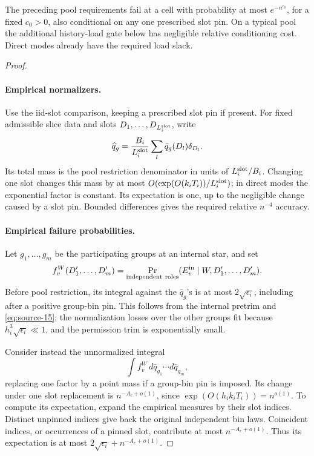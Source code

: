 \begin{lemma}\label{lem:typical-cell-pools}
The preceding pool requirements fail at a cell with probability at most
\(e^{-n^{c_0}}\), for a fixed \(c_0>0\), also conditional on any one
prescribed slot pin. On a typical pool the additional history-load gate
below has negligible relative conditioning cost. Direct modes already
have the required load slack.
\end{lemma}

\begin{proof}\leavevmode\par
\paragraph{Empirical normalizers.}
Use the iid-slot comparison, keeping a prescribed slot pin if present.
For fixed admissible slice data and slots \(D_1,\ldots,D_{L_i^{\rm slot}}\),
write
\[
 \widehat q_g=
 \frac{B_i}{L_i^{\rm slot}}\sum_l\bar q_g(D_l)\delta_{D_l}.
\]
Its total mass is the pool restriction denominator in units of
\(L_i^{\rm slot}/B_i\). Changing one slot changes this mass by at most
\(O(\exp(O(k_iT_i))/L_i^{\rm slot})\); in direct modes the exponential
factor is constant. Its expectation is one, up to the negligible change
caused by a slot pin. Bounded differences gives the required relative
\(n^{-4}\) accuracy.

\paragraph{Empirical failure probabilities.}
Let \(g_1,\ldots,g_m\) be the participating groups at an internal star,
and set
\[
 f_v^W(D_1',\ldots,D_m')
   =\Pr_{\rm independent\ roles}(E_v^{\rm in}\mid W,D_1',\ldots,D_m').
\]
Before pool restriction, its integral against the \(\bar q_g\)'s is at
most \(2\sqrt{\epsilon_i}\), including after a positive group-bin pin.
This follows from the internal pretrim and \eqref{eq:source-15}; the
normalization losses over the other groups fit because
\(h_i^3\sqrt{\epsilon_i}\ll1\), and the permission trim is exponentially
small.

Consider instead the unnormalized integral
\[
 \int f_v^W\,d\widehat q_{g_1}\cdots d\widehat q_{g_m},
\]
replacing one factor by a point mass if a group-bin pin is imposed. Its
change under one slot replacement is \(n^{-A_c+o(1)}\), since
\(\exp(O(h_i k_iT_i))=n^{o(1)}\). To compute its expectation, expand the
empirical measures by their slot indices. Distinct unpinned indices give
back the original independent bin laws. Coincident indices, or occurrences
of a pinned slot, contribute at most \(n^{-A_c+o(1)}\). Thus its
expectation is at most \(2\sqrt{\epsilon_i}+n^{-A_c+o(1)}\).


\end{proof}
